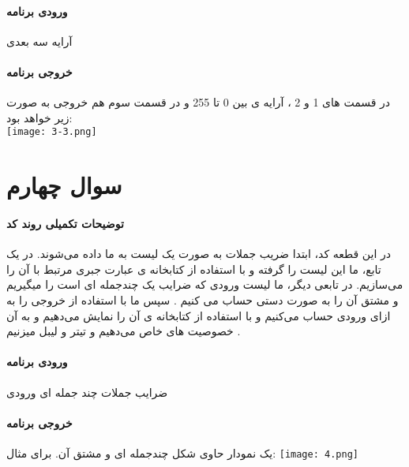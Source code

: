 \documentclass[12pt]{article}
\begin{document}
	\paragraph{ورودی برنامه}
	آرایه سه بعدی

	\paragraph{خروجی برنامه}
	در قسمت های 1 و 2 ، آرایه ی بین 0 تا 255 و در قسمت سوم هم خروجی به صورت زیر خواهد بود:\\
	
	\centering
	\texttt{[image: 3-3.png]}

	\newpage
	\raggedleft
	\section{سوال چهارم}
	
	\paragraph{توضیحات تکمیلی روند کد}
	در این قطعه کد، ابتدا ضریب جملات به صورت یک لیست به ما داده می‌شوند. در یک تابع، ما این لیست را گرفته و با استفاده از کتابخانه ی
عبارت جبری مرتبط با آن را می‌سازیم. 
در تابعی دیگر، ما لیست ورودی که ضرایب یک چندجمله ای است را میگیریم و مشتق آن را به صورت دستی حساب می کنیم .
سپس ما با استفاده از 
خروجی را به ازای ورودی حساب می‌کنیم و با استفاده از کتابخانه ی 
آن را نمایش می‌دهیم و به آن خصوصیت های خاص می‌دهیم و تیتر و لیبل میزنیم .

	\paragraph{ورودی برنامه}
	ضرایب جملات چند جمله ای ورودی
	\paragraph{خروجی برنامه}
	یک نمودار حاوی شکل چندجمله ای و مشتق آن. برای مثال:
	\texttt{[image: 4.png]}
\end{document}
